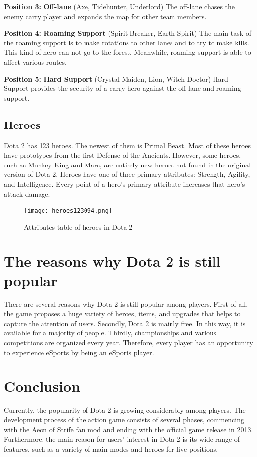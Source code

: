 \documentclass[12pt,twoside,english,a4paper]{article}
\begin{document}
\textbf{Position 3: Off-lane }(Axe, Tidehunter, Underlord)
The off-lane chases the enemy carry player and expands the map for other team members.

\textbf{Position 4: Roaming Support    } (Spirit Breaker, Earth Spirit)                            
The main task of the roaming support is to make rotations to other lanes and to try to make kills. This kind of hero can not go to the forest. Meanwhile, roaming support is able to affect various routes.

\textbf{Position 5: Hard Support}       (Crystal Maiden, Lion, Witch Doctor)            
Hard Support provides the security of a carry hero against the off-lane and roaming support.
\subsection{Heroes} \label{heroes}
Dota 2 has 123 heroes. The newest of them is Primal Beast. Most of these heroes have prototypes from the first Defense of the Ancients. However, some heroes, such as Monkey King and Mars, are entirely new heroes not found in the original version of Dota 2.
Heroes have one of three primary attributes: Strength, Agility, and Intelligence. Every point of a hero's primary attribute increases that hero's attack damage.
 \begin{figure}[H]
  \centering
  \caption{Attributes table of heroes in Dota 2\cite{Heroes:DOTA}}
  \texttt{[image: heroes123094.png]}
  \label{fig:heroes}
 \end{figure}  
\section{The reasons why Dota 2 is still popular} \label{the reasons why Dota 2 is still popular}
There are several reasons why Dota 2 is still popular among players. First of all, the game proposes a huge variety of heroes, items, and upgrades that helps to capture the attention of users. Secondly, Dota 2 is mainly free. In this way, it is available for a majority of people. Thirdly, championships and various competitions are organized every year. Therefore, every player has an opportunity to experience eSports by being an eSports player.\cite{Reasons:DOTA}
\section{Conclusion} \label{conclusion} %
Currently, the popularity of Dota 2 is growing considerably among players. The development process of the action game consists of several phases, commencing with the Aeon of Strife fan mod and ending with the official game release in 2013. Furthermore, the main reason for users’ interest in Dota 2 is its wide range of features, such as a variety of main modes and heroes for five positions. 
\end{document}
